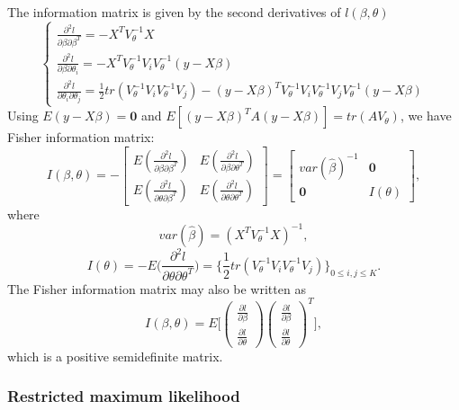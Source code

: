 \documentclass[
]{article}
\begin{document}
The information matrix is given by the second derivatives of
\(l(\beta, \theta)\) \begin{equation}\label{mleH} 
\left\{
\begin{array}{l}
\frac{\partial^2l}{\partial\beta\partial\beta^T} = - X^TV_{\theta} ^{-1}X\\
\frac{\partial^2l}{\partial\beta\partial\theta_i} = - X^TV_{\theta} ^{-1}V_iV_{\theta}^{-1}(y-X\beta)\\
\frac{\partial^2l}{\partial\theta_i\partial\theta_j} = \frac{1}{2}tr(V_{\theta}^{-1}V_iV_{\theta}^{-1}V_j) - (y-X\beta)^TV_{\theta} ^{-1}V_iV_{\theta} ^{-1}V_jV_{\theta}^{-1}(y-X\beta)
\end{array} \right.
\end{equation} Using \(E(y-X\beta) = \mathbf{0}\) and
\(E[(y-X\beta)^TA(y-X\beta)] = tr(AV_{\theta})\), we have Fisher
information matrix: \begin{equation}\label{mleI}
I(\beta, \theta) = 
-\begin{bmatrix} 
E(\frac{\partial^2l}{\partial\beta\partial\beta^T}) & E(\frac{\partial^2l}{\partial\beta\partial\theta^T})\\
E(\frac{\partial^2l}{\partial\theta\partial\beta^T}) & E(\frac{\partial^2l}{\partial\theta\partial\theta^T})
\end{bmatrix}=
\begin{bmatrix} 
var(\hat\beta)^{-1} & \mathbf{0}\\
\mathbf{0} & I(\theta)
\end{bmatrix},
\end{equation} where \[
var(\hat\beta) = (X^TV_{\theta}^{-1}X)^{-1},
\] \[
I(\theta) = -E\Big(\frac{\partial^2l}{\partial\theta\partial\theta^T}\Big) 
= \big\{\frac{1}{2}tr(V_{\theta}^{-1}V_iV_{\theta}^{-1}V_j) \big\}_{0\leq i,j\leq K}.
\] The Fisher information matrix may also be written as \[
I(\beta, \theta) = 
E\Bigg[
\begin{pmatrix}
\frac{\partial l}{\partial\beta}\\
\frac{\partial l}{\partial\theta}
\end{pmatrix}
\begin{pmatrix}
\frac{\partial l}{\partial\beta}\\
\frac{\partial l}{\partial\theta}
\end{pmatrix}^T\Bigg],
\] which is a positive semidefinite matrix.

\hypertarget{restricted-maximum-likelihood}{%
\subsubsection{Restricted maximum
likelihood}\label{restricted-maximum-likelihood}}
\end{document}
